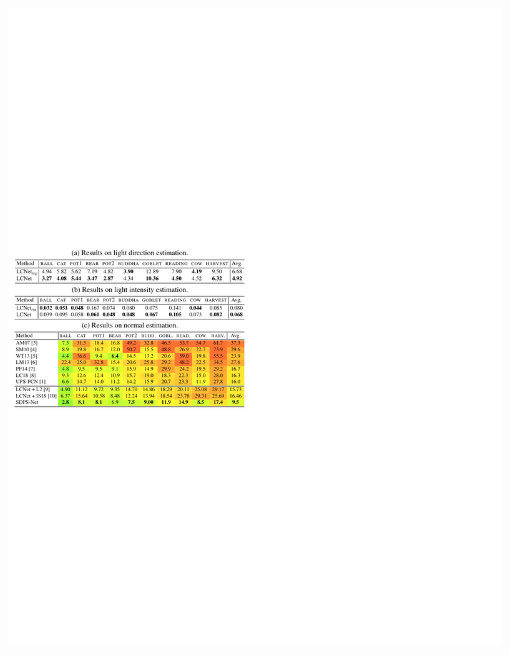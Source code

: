 \documentclass[landscape,a0paper,fontscale=0.292]{baposter}
\begin{document}
\begin{poster}
{\begin{minipage}[t]{0.47\textwidth}
\begin{center}
            \includegraphics[width=0.98\textwidth]{images/quant_diligent.pdf}
        \end{center}
    \end{minipage}

}
\end{poster}
\end{document}
